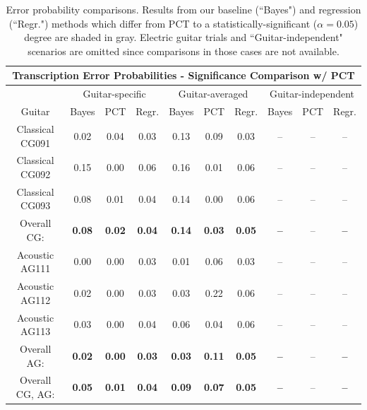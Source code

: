 \documentclass[convention,peer-reviewed]{aesconf}
\begin{document}
\begin{table}[!htbp]
\begin{center}
\begin{tabular} {||c||c|c|c||c|c|c||c|c|c||}
\hline
\multicolumn{10}{||c||}{\bf{Transcription Error Probabilities - Significance Comparison w/ PCT}} \\
\hline
 & \multicolumn{3}{|c||}{Guitar-specific} & \multicolumn{3}{|c||}{Guitar-averaged}& \multicolumn{3}{|c||}{Guitar-independent}\\
\hline
Guitar & Bayes & PCT & Regr. & Bayes & PCT & Regr. & Bayes & PCT & Regr.\\
\hline
\hline
Classical CG091 &  \cellcolor[gray]{0.8}0.02 & 0.04 & 0.03 &  \cellcolor[gray]{0.8}0.13 & 0.09 &  \cellcolor[gray]{0.8}0.03 & -- & -- & -- \\
\hline
Classical CG092 &  \cellcolor[gray]{0.8}0.15 & 0.00 &  \cellcolor[gray]{0.8}0.06 &  \cellcolor[gray]{0.8}0.16 & 0.01 &  \cellcolor[gray]{0.8}0.06 & -- & -- & -- \\
\hline
Classical CG093 &  \cellcolor[gray]{0.8}0.08 & 0.01 &  \cellcolor[gray]{0.8}0.04 & \cellcolor[gray]{0.8}0.14 & 0.00 &  \cellcolor[gray]{0.8}0.06 & -- & -- & -- \\
\hline
Overall CG: &  \cellcolor[gray]{0.8}\bf{0.08} & \bf{0.02}  &  \cellcolor[gray]{0.8}\bf{0.04} &  \cellcolor[gray]{0.8}\bf{0.14} & \bf{0.03} &  \cellcolor[gray]{0.8}\bf{0.05} & \bf{--} & -- & \bf{--}\\
\hline
\hline
Acoustic AG111 & 0.00 & 0.00 &  \cellcolor[gray]{0.8}0.03 &  \cellcolor[gray]{0.8}0.01 & 0.06 &  \cellcolor[gray]{0.8}0.03 & -- & -- & -- \\
\hline
Acoustic AG112 &  \cellcolor[gray]{0.8}0.02 & 0.00 &  \cellcolor[gray]{0.8}0.03 &  \cellcolor[gray]{0.8}0.03 & 0.22 &  \cellcolor[gray]{0.8}0.06 & -- & -- & -- \\
\hline
Acoustic AG113  &  \cellcolor[gray]{0.8}0.03 & 0.00 &  \cellcolor[gray]{0.8}0.04 &  \cellcolor[gray]{0.8}0.06 & 0.04 &  \cellcolor[gray]{0.8}0.06 & -- & -- & --\\
\hline
Overall AG: &  \cellcolor[gray]{0.8}\bf{0.02} & \bf{0.00} &  \cellcolor[gray]{0.8}\bf{0.03} &  \cellcolor[gray]{0.8}\bf{0.03} & \bf{0.11} &  \cellcolor[gray]{0.8}\bf{0.05} & \bf{--} & -- & \bf{--}\\
\hline
\hline
\hline
Overall CG, AG: &   \cellcolor[gray]{0.8}\bf{0.05} & \bf{0.01} &   \cellcolor[gray]{0.8}\bf{0.04} &  \cellcolor[gray]{0.8}\bf{0.09} & \bf{0.07} &  \cellcolor[gray]{0.8}\bf{0.05} & \bf{--} & -- & \bf{--}\\
\hline
\hline
\end{tabular}
\caption{Error probability comparisons. Results from our baseline (``Bayes") and regression (``Regr.") methods which differ from PCT to a statistically-significant ($\alpha=0.05$) degree are shaded in gray. Electric guitar trials and ``Guitar-independent" scenarios are omitted since comparisons in those cases are not available.}
\label{tab:ttest-RWC}
\end{center}
\end{table}
\end{document}
